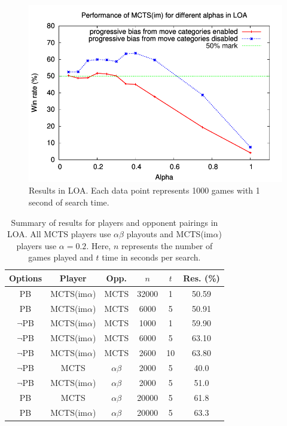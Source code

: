 \documentclass{article}
\begin{document}
\begin{figure}[t!]
\begin{center}
\includegraphics[scale=0.7]{plots/loa-alpha}
\caption{Results in LOA. Each data point represents 1000 games with 1 second of search time. } 
\label{fig:loa-alpha}
\end{center}
\end{figure}

\begin{table}[th]
{\small
\begin{center}
\begin{tabular}{ccccc|c}
Options & Player        & Opp. & $n$ & $t$ & Res. (\%) \\
\hline
\hline
PB      & MCTS(im$\alpha$) & MCTS     & 32000 & 1        & 50.59       \\
PB      & MCTS(im$\alpha$) & MCTS     & 6000  & 5        & 50.91       \\
\hline
$\neg$PB & MCTS(im$\alpha$) & MCTS & 1000 & 1  & 59.90       \\
$\neg$PB & MCTS(im$\alpha$) & MCTS & 6000 & 5  & 63.10       \\
$\neg$PB & MCTS(im$\alpha$) & MCTS & 2600 & 10 & 63.80       \\
\hline
$\neg$PB & MCTS             & $\alpha \beta$ & 2000 & 5  & 40.0       \\
$\neg$PB & MCTS(im$\alpha$) & $\alpha \beta$ & 2000 & 5 & 51.0       \\
\hline
PB       & MCTS             & $\alpha \beta$ & 20000 & 5  & 61.8       \\
PB       & MCTS(im$\alpha$) & $\alpha \beta$ & 20000 & 5  & 63.3       \\
\hline
\end{tabular}
\end{center}
\caption{Summary of results for players and opponent pairings in LOA. 
All MCTS players use $\alpha \beta$ playouts and MCTS(im$\alpha$) players use $\alpha = 0.2$. 
Here, $n$ represents the number of games played and $t$ time in seconds per search.}
\label{tbl:loaresults}
}
\end{table}
\end{document}
